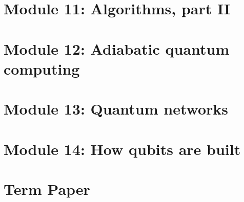 \section{Module 11: Algorithms, part II}


\section{Module 12: Adiabatic quantum computing}


\section{Module 13: Quantum networks}


\section{Module 14: How qubits are built}


\section{Term Paper}




